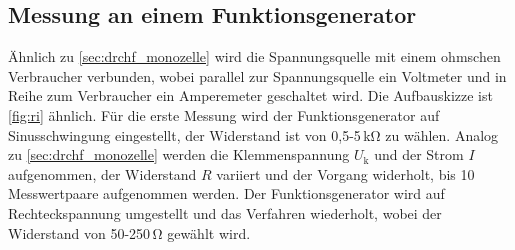 \subsection{Messung an einem Funktionsgenerator}
\label{sec:drchf_funktion}
Ähnlich zu \ref{sec:drchf_monozelle} wird die Spannungsquelle mit einem ohmschen Verbraucher verbunden, wobei parallel zur Spannungsquelle ein Voltmeter und in Reihe zum Verbraucher ein Amperemeter geschaltet wird.
Die Aufbauskizze ist \ref{fig:ri} ähnlich.
Für die erste Messung wird der Funktionsgenerator auf Sinusschwingung eingestellt, der Widerstand ist von 0,5-5\,\si{\kilo\ohm} zu wählen.
Analog zu \ref{sec:drchf_monozelle} werden die Klemmenspannung  $U_\text{k}$ und der Strom $I$ aufgenommen, der Widerstand $R$ variiert und der Vorgang widerholt, bis 10 Messwertpaare aufgenommen werden.
Der Funktionsgenerator wird auf Rechteckspannung umgestellt und das Verfahren wiederholt, wobei
der Widerstand von 50-250\,\si{\ohm} gewählt wird.
